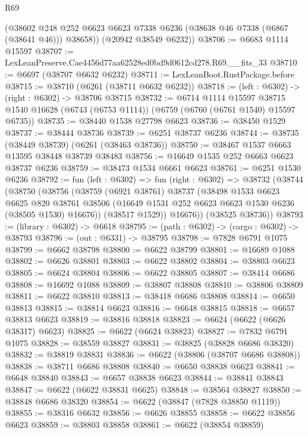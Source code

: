 \begin{lexlean}{R69}
\begin{coremodule}
{        (@38602 @248 @252 @6623 @6623 @7338 @6236 (@38638 @46 @7338 (@6867 (@38641 @46))) @38658))
      (@20942 @38549 @6232))
@38706 := @6683 @1114 @15597
@38707 := LexLeanPreserve.Cae4456d77aa62528ed0bd9d0612cd278.R69.__fits_33
@38710 := @6697 (@38707 @6632 @6232)
@38711 := LexLeanBoot.RustPackage.before
@38715 := @38710 (@6261 (@38711 @6632 @6232))
@38718 := (left : @6302) -> (right : @6302) -> @38706 @38715
@38732 := @6714
    @1114
    @15597
    @38715
    @1540
    @16628
    (@6743 (@6753 @1114))
    (@6759 (@6760 (@6761 @1540) @15597 @6735))
@38735 := @38440 @1538 @27798 @6623
@38736 := @38450 @1529
@38737 := @38444 @38736
@38739 := @6251 @38737 @6236
@38744 := @38735 (@38449 @38739) (@6261 (@38463 @38736))
@38750 := @38467 @1537 @6663 @13595 @38448 @38739 @38483
@38756 := @16649 @1535 @252 @6663 @6623 @38737 @6236
@38759 := @38473 @1534 @6661 @6623
@38761 := @6251 @1530 @6236
@38792 := fun (left : @6302) =>
  fun (right : @6302) =>
  @38732
    (@38744
      (@38750
        (@38756
          (@38759
            (@6921 @38761)
            @38737
            (@38498
              @1533
              @6623
              @6625
              @820
              @38761
              @38506
              (@16649 @1531 @252 @6623 @6623 @1530 @6236 (@38505 @1530) @16676))
            (@38517 @1529))
          @16676))
      (@38525 @38736))
@38793 := (library : @6302) -> @6618
@38795 := (path : @6302) -> (cargo : @6302) -> @38793
@38796 := (out : @6331) -> @38795
@38798 := @7828 @6791 @1075
@38799 := @6662 @38798
@38800 := @6622 @38799
@38801 := @16689 @1088
@38802 := @6626 @38801
@38803 := @6622 @38802
@38804 := @38803 @6623
@38805 := @6624 @38804
@38806 := @6622 @38805
@38807 := @38414 @6686
@38808 := @16692 @1088
@38809 := @38807 @38808
@38810 := @38806 @38809
@38811 := @6622 @38810
@38813 := @38418 @6686 @38808
@38814 := @6650 @38813
@38815 := @38814 @6623
@38816 := @6648 @38815
@38818 := @6657 @38813 @6623
@38819 := @38816 @38818
@38823 := @6624 (@6622 (@6626 @38317) @6623)
@38825 := @6622 (@6624 @38823)
@38827 := @7832 @6791 @1075
@38828 := @38559 @38827
@38831 := @38825 (@38828 @6686 @38320)
@38832 := @38819 @38831
@38836 := @6622 (@38806 (@38707 @6686 @38808))
@38838 := @38711 @6686 @38808
@38840 := @6650 @38838 @6623
@38841 := @6648 @38840
@38843 := @6657 @38838 @6623
@38844 := @38841 @38843
@38847 := @6622 (@6622 @38831 @6625)
@38848 := @38564 @38827
@38850 := @38848 @6686 @38320
@38854 := @6622 (@38847 (@7828 @38850 @1119))
@38855 := @38316 @6632
@38856 := @6626 @38855
@38858 := @6622 @38856 @6623
@38859 := @38803 @38858
@38861 := @6622 (@38854 @38859)
}
\end{coremodule}
\end{lexlean}

